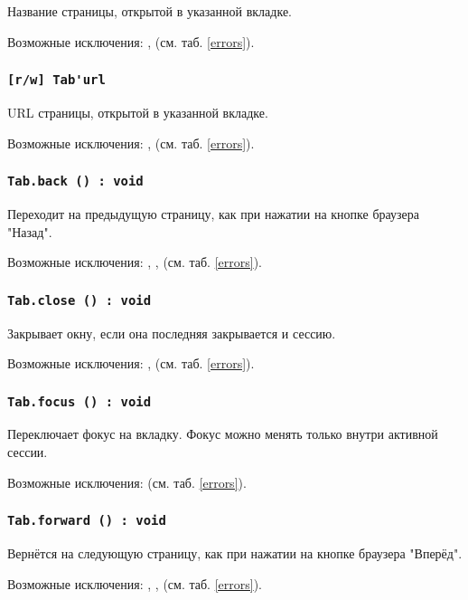 Название страницы, открытой в указанной вкладке.

Возможные исключения: ,  (см. таб. \ref{errors}).

\subsubsection{\lstinline|[r/w] Tab'url|}

URL страницы, открытой в указанной вкладке.

Возможные исключения: ,  (см. таб. \ref{errors}).

\subsubsection{\lstinline|Tab.back () : void|}

Переходит на предыдущую страницу, как при нажатии на кнопке браузера "Назад".

Возможные исключения: , ,  (см. таб. \ref{errors}).

\subsubsection{\lstinline|Tab.close () : void|}

Закрывает окну, если она последняя закрывается и сессию.

Возможные исключения: ,  (см. таб. \ref{errors}).

\subsubsection{\lstinline|Tab.focus () : void|}

Переключает фокус на вкладку. Фокус можно менять только внутри активной сессии.

Возможные исключения:  (см. таб. \ref{errors}).

\subsubsection{\lstinline|Tab.forward () : void|}

Вернётся на следующую страницу, как при нажатии на кнопке браузера "Вперёд".

Возможные исключения: , ,  (см. таб. \ref{errors}).

